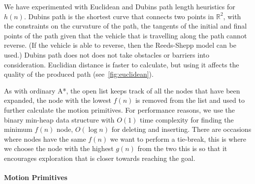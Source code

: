 \documentclass[a4paper, 10pt, conference]{ieeeconf}      %
\begin{document}
We have experimented with Euclidean and Dubins path length heuristics for
$h(n)$.  Dubins path is the shortest curve that connects two points in
$\mathbb{R}^2$, with the constraints on the curvature of the path, the
tangents of the initial and final points of the path given that the vehicle
that is travelling along the path cannot reverse. (If the vehicle is able to
reverse, then the Reeds-Shepp model can be used.) Dubins path does not does
not take obstacles or barriers into consideration.  Euclidian distance is faster
to calculate, but using it affects the
quality of the produced path (see~\cref{fig:euclidean}).

As with ordinary A*, the open list keeps track of all the nodes that have been
expanded, the node with the lowest $f(n)$ is removed from the list and used
to further calculate the motion primitives.  For performance reasons, we use
the binary min-heap data structure with $O(1)$ time complexity for finding the
minimum $f(n)$ node, $O(\log n)$ for deleting and inserting.  There are
occasions where nodes have the same $f(n)$ we want to perform a tie-break,
this is where we choose the node with the highest $g(n)$ from the two this is
so that it encourages exploration that is closer towards reaching the goal.
\paragraph*{Motion Primitives}
\end{document}
